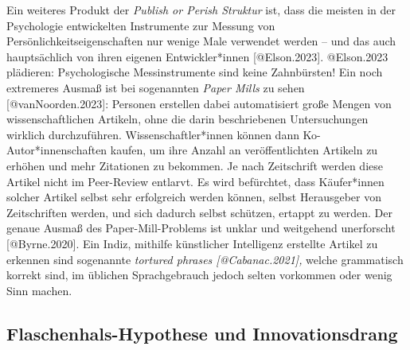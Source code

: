 \documentclass[
  letterpaper,
  DIV=11,
  numbers=noendperiod]{scrreprt}
\begin{document}
Ein weiteres Produkt der \emph{Publish or Perish Struktur} ist, dass die
meisten in der Psychologie entwickelten Instrumente zur Messung von
Persönlichkeitseigenschaften nur wenige Male verwendet werden -- und das
auch hauptsächlich von ihren eigenen Entwickler*innen {[}@Elson.2023{]}.
@Elson.2023 plädieren: Psychologische Messinstrumente sind keine
Zahnbürsten! Ein noch extremeres Ausmaß ist bei sogenannten \emph{Paper
Mills} zu sehen {[}@vanNoorden.2023{]}: Personen erstellen dabei
automatisiert große Mengen von wissenschaftlichen Artikeln, ohne die
darin beschriebenen Untersuchungen wirklich durchzuführen.
Wissenschaftler*innen können dann Ko-Autor*innenschaften kaufen, um ihre
Anzahl an veröffentlichten Artikeln zu erhöhen und mehr Zitationen zu
bekommen. Je nach Zeitschrift werden diese Artikel nicht im Peer-Review
entlarvt. Es wird befürchtet, dass Käufer*innen solcher Artikel selbst
sehr erfolgreich werden können, selbst Herausgeber von Zeitschriften
werden, und sich dadurch selbst schützen, ertappt zu werden. Der genaue
Ausmaß des Paper-Mill-Problems ist unklar und weitgehend unerforscht
{[}@Byrne.2020{]}. Ein Indiz, mithilfe künstlicher Intelligenz erstellte
Artikel zu erkennen sind sogenannte \emph{tortured phrases
{[}@Cabanac.2021{]},} welche grammatisch korrekt sind, im üblichen
Sprachgebrauch jedoch selten vorkommen oder wenig Sinn machen.

\subsection{Flaschenhals-Hypothese und
Innovationsdrang}\label{flaschenhals-hypothese-und-innovationsdrang}
\end{document}
